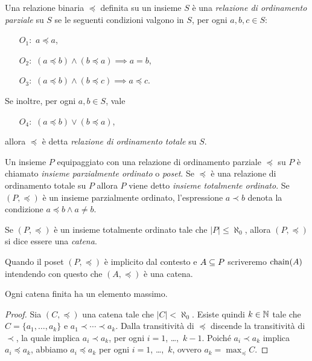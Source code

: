 \begin{definizione}  
Una relazione binaria $\preceq$ definita su un insieme
$S$ \`e una \emph{relazione di ordinamento parziale} su $S$
se le seguenti condizioni valgono in $S$,
per ogni $a, b, c \in S$:
\begin{itemize}
\item[$O_1:$] $a \preceq a$,
\item[$O_2:$] $(a \preceq b) \land (b \preceq a) \implies a = b$,
\item[$O_3:$] $(a \preceq b) \land (b \preceq c) \implies a \preceq c$.
\end{itemize}
Se inoltre, per ogni $a, b \in S$, vale
\begin{itemize}
\item[$O_4:$] $(a \preceq b) \lor (b \preceq a)$,
\end{itemize}
allora $\preceq$ \`e detta \emph{relazione di ordinamento totale} su $S$.
\end{definizione}

\begin{definizione} 
Un insieme $P$ equipaggiato con una relazione di ordinamento
parziale $\preceq$ su $P$ \`e chiamato
\emph{insieme parzialmente ordinato} o \emph{poset}.
Se $\preceq$ \`e una relazione di
ordinamento totale su $P$ allora $P$ viene detto
\emph{insieme totalmente ordinato}.
Se $(P, \preceq)$ \`e un insieme parzialmente ordinato,
l'espressione $a \prec b$ denota
la condizione $a \preceq b \land a \neq b$.
\end{definizione}

\begin{definizione} 
Se $(P, \preceq)$ \`e un insieme totalmente ordinato
tale che $|P| \leq \aleph _0$, allora $(P, \preceq)$ si dice essere una
\emph{catena}.
\end{definizione}

Quando il poset $(P, \preceq)$ \`e implicito dal contesto
e $A \subseteq P$ scriveremo $\mathop{\mathrm{chain}}\nolimits(A)$ intendendo con questo
che $(A, \preceq)$ \`e una catena.

\begin{proposizione}
\label{prop:catena-finita-ha-elemento-massimo}
Ogni catena finita ha un elemento massimo.
\end{proposizione}
\begin{proof}
Sia $(C, \preceq)$ una catena tale che $|C| < \aleph_0$.
Esiste quindi $k \in \mathbb{N}$ tale che $C = \{ a_1, \dots, a_k \}$
e $a_1 \prec \cdots \prec a_k$.
Dalla transitivit\`a di $\preceq$ discende la transitivit\`a di $\prec$,
la quale implica $a_i \prec a_k$, per ogni $i = 1$, \dots,~$k-1$.
Poich\'e $a_i \prec a_k$ implica $a_i \preceq a_k$, abbiamo
$a_i \preceq a_k$ per ogni $i = 1$, \dots,~$k$, ovvero $a_k = \max_\preceq C$.
\end{proof}


